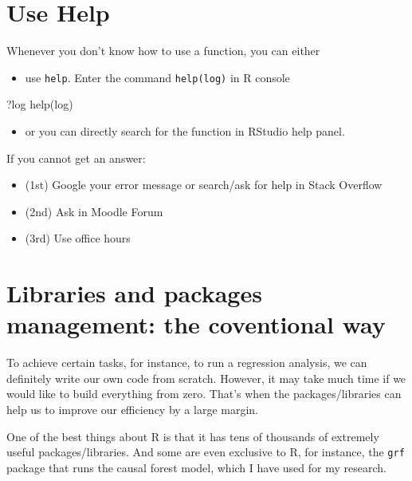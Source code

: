 \documentclass[
  11pt,
]{book}
\newenvironment{Shaded}{\begin{snugshade}}{\end{snugshade}}
\newcommand{\FunctionTok}[1]{\textcolor[rgb]{0.00,0.00,0.00}{#1}}
\newcommand{\NormalTok}[1]{#1}
\providecommand{\tightlist}{%
  \setlength{\itemsep}{0pt}\setlength{\parskip}{0pt}}
\begin{document}
\hypertarget{use-help}{%
\section{Use Help}\label{use-help}}

Whenever you don't know how to use a function, you can either

\begin{itemize}
\tightlist
\item
  use \texttt{help}. Enter the command \texttt{help(log)} in R console
\end{itemize}

\begin{Shaded}
\begin{Highlighting}[]
\NormalTok{?log}
\FunctionTok{help}\NormalTok{(log)}
\end{Highlighting}
\end{Shaded}

\begin{itemize}
\tightlist
\item
  or you can directly search for the function in RStudio help panel.
\end{itemize}

If you cannot get an answer:

\begin{itemize}
\item
  (1st) Google your error message or search/ask for help in Stack Overflow
\item
  (2nd) Ask in Moodle Forum
\item
  (3rd) Use office hours
\end{itemize}

\hypertarget{libraries-and-packages-management-the-coventional-way}{%
\section{Libraries and packages management: the coventional way}\label{libraries-and-packages-management-the-coventional-way}}

To achieve certain tasks, for instance, to run a regression analysis, we can definitely write our own code from scratch. However, it may take much time if we would like to build everything from zero. That's when the packages/libraries can help us to improve our efficiency by a large margin.

One of the best things about R is that it has tens of thousands of extremely useful packages/libraries. And some are even exclusive to R, for instance, the \texttt{grf} package that runs the causal forest model, which I have used for my research.
\end{document}
